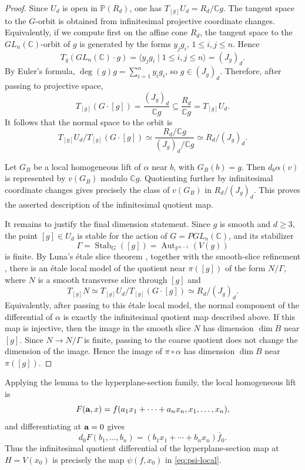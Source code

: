\documentclass[11pt]{amsart}
\theoremstyle{plain}
\theoremstyle{definition}
\numberwithin{equation}{section}
\newcommand{\C}{\mathbb{C}}
\newcommand{\PP}{\mathbb{P}}
\DeclareMathOperator{\Aut}{Aut}
\begin{document}
\begin{proof}
Since $U_d$ is open in $\PP(R_d)$, one has
$T_{[g]}U_d=R_d/\C g$. The tangent space to the $G$-orbit is obtained from
infinitesimal projective coordinate changes. Equivalently, if we compute first
on the affine cone $R_d$, the tangent space to the $GL_n(\C)$-orbit of $g$ is
generated by the forms $y_jg_i$, $1\leq i,j\leq n$. Hence
\[
T_g(GL_n(\C)\cdot g)=\langle y_jg_i\mid 1\leq i,j\leq n\rangle=(J_g)_d .
\]
By Euler's formula, $\deg(g)g=\sum_{i=1}^n y_ig_i$, so $g\in (J_g)_d$.
Therefore, after passing to projective space,
\[
T_{[g]}(G\cdot[g])
=
\frac{(J_g)_d}{\C g}
\subseteq
\frac{R_d}{\C g}
=
T_{[g]}U_d .
\]
It follows that the normal space to the orbit is
\[
T_{[g]}U_d/T_{[g]}(G\cdot[g])
\simeq
\frac{R_d/\C g}{(J_g)_d/\C g}
\simeq
R_d/(J_g)_d .
\]

Let $G_B$ be a local homogeneous lift of $\alpha$ near $b$, with $G_B(b)=g$.
Then $d_b\alpha(v)$ is represented by $v(G_B)$ modulo $\C g$. Quotienting
further by infinitesimal coordinate changes gives precisely the class of
$v(G_B)$ in $R_d/(J_g)_d$. This proves the asserted description of the
infinitesimal quotient map.

It remains to justify the final dimension statement. Since $g$ is smooth and
$d\geq3$, the point $[g]\in U_d$ is stable for the action of $G=PGL_n(\C)$, and
its stabilizer
\[
\Gamma=\operatorname{Stab}_G([g])
=\Aut_{\PP^{n-1}}(V(g))
\]
is finite. By Luna's \'{e}tale slice theorem
\cite[Chapitre~III, \S1, Th\'eor\`eme du slice \'etale, p.~97]{Luna}, together
with the smooth-slice refinement
\cite[Chapitre~III, \S1, Remarque~1$^\circ$ following the theorem, p.~97]{Luna},
there is an \'{e}tale local model of the quotient near $\pi([g])$ of the form
$N/\Gamma$, where $N$ is a smooth transverse slice through $[g]$ and
\[
T_{[g]}N\simeq T_{[g]}U_d/T_{[g]}(G\cdot[g])
\simeq R_d/(J_g)_d .
\]
Equivalently, after passing to this \'{e}tale local model, the normal component
of the differential of $\alpha$ is exactly the infinitesimal quotient map
described above. If this map is injective, then the image in the smooth slice
$N$ has dimension $\dim B$ near $[g]$. Since $N\to N/\Gamma$ is finite, passing
to the coarse quotient does not change the dimension of the image. Hence the
image of $\pi\circ\alpha$ has dimension $\dim B$ near $\pi([g])$.
\end{proof}

Applying the lemma to the hyperplane-section family, the local homogeneous lift
is
\[
F({\bf a},x)=f(a_1x_1+\cdots+a_nx_n,x_1,\ldots,x_n),
\]
and differentiating at ${\bf a}=0$ gives
\[
d_0F(b_1,\ldots,b_n)
=
(b_1x_1+\cdots+b_nx_n)\overline f_0.
\]
Thus the infinitesimal quotient differential of the hyperplane-section map at
$H=V(x_0)$ is precisely the map $\psi(f,x_0)$ in \eqref{eq:psi-local}.
\end{document}
